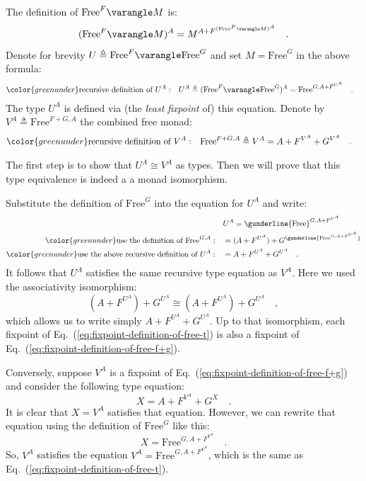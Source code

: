 The definition of $\text{Free}^{F}\varangle M$ is: 
\[
(\text{Free}^{F}\varangle M)^{A}=M^{A+F^{(\text{Free}^{F}\varangle M)^{A}}}\quad.
\]
Denote for brevity $U\triangleq\text{Free}^{F}\varangle\text{Free}^{G}$
and set $M=\text{Free}^{G}$ in the above formula:
\begin{align}
{\color{greenunder}\text{recursive definition of }U^{A}:}\quad & U^{A}\triangleq(\text{Free}^{F}\varangle\text{Free}^{G})^{A}=\text{Free}^{G,A+F^{U^{A}}}\quad.\label{eq:fixpoint-definition-of-free-t}
\end{align}
The type $U^{A}$ is defined via (the \emph{least} \emph{fixpoint}
of) this equation. Denote by $V^{A}\triangleq\text{Free}^{F+G,A}$
the combined free monad:
\begin{align}
{\color{greenunder}\text{recursive definition of }V^{A}:}\quad & \text{Free}^{F+G,A}\triangleq V^{A}=A+F^{V^{A}}+G^{V^{A}}\quad.\label{eq:fixpoint-definition-of-free-f+g}
\end{align}

The first step is to show that $U^{A}\cong V^{A}$ as types. Then
we will prove that this type equivalence is indeed a a monad isomorphism. 

Substitute the definition of $\text{Free}^{G}$ into the equation
for $U^{A}$ and write:
\begin{align*}
 & U^{A}=\gunderline{\text{Free}}^{G,A+F^{U^{A}}}\\
{\color{greenunder}\text{use the definition of }\text{Free}^{G,A}:}\quad & =(A+F^{U^{A}})+G^{\gunderline{\text{Free}^{G,A+F^{U^{A}}}}}\\
{\color{greenunder}\text{use the above recursive definition of }U^{A}:}\quad & =A+F^{U^{A}}+G^{U^{A}}\quad.
\end{align*}
It follows that $U^{A}$ satisfies the same recursive type equation
as $V^{A}$. Here we used the associativity isomorphism:
\[
(A+F^{U^{A}})+G^{U^{A}}\cong(A+F^{U^{A}})+G^{U^{A}}\quad,
\]
which allows us to write simply $A+F^{U^{A}}+G^{U^{A}}$. Up to that
isomorphism, each fixpoint of Eq.~(\ref{eq:fixpoint-definition-of-free-t})
is also a fixpoint of Eq.~(\ref{eq:fixpoint-definition-of-free-f+g}).

Conversely, suppose $V^{A}$ is a fixpoint of Eq.~(\ref{eq:fixpoint-definition-of-free-f+g})
and consider the following type equation:
\[
X=A+F^{V^{A}}+G^{X}\quad.
\]
It is clear that $X=V^{A}$ satisfies that equation. However, we can
rewrite that equation using the definition of $\text{Free}^{G}$ like
this:
\[
X=\text{Free}^{G,A+F^{V^{A}}}\quad.
\]
So, $V^{A}$ satisfies the equation $V^{A}=\text{Free}^{G,A+F^{V^{A}}}$,
which is the same as Eq.~(\ref{eq:fixpoint-definition-of-free-t}).

